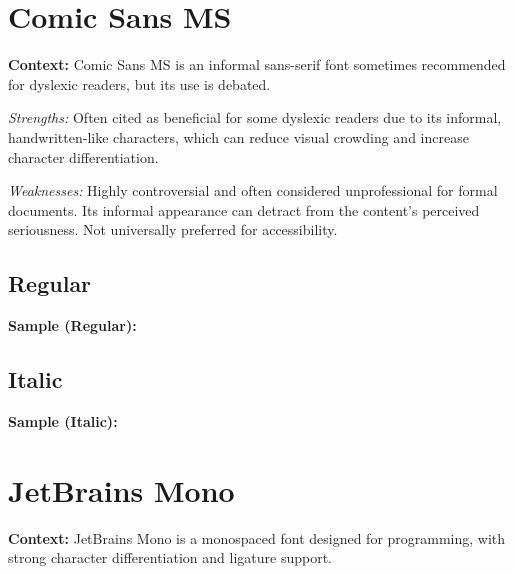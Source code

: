 \pagebreak
\section{Comic Sans MS}\label{trouble9}
\noindent
\textbf{Context:} Comic Sans MS is an informal sans-serif font sometimes recommended for dyslexic readers, but its use is debated.

\begin{raggedright}
\emph{Strengths:} Often cited as beneficial for some dyslexic readers due to its informal, handwritten-like characters, which can reduce visual crowding and increase character differentiation.

\emph{Weaknesses:} Highly controversial and often considered unprofessional for formal documents. Its informal appearance can detract from the content's perceived seriousness. Not universally preferred for accessibility.

\subsection{Regular}
\noindent\textbf{Sample (Regular):}
\FontSample{\comicsansfont}

\subsection{Italic}
\noindent\textbf{Sample (Italic):}
\FontSample{{\comicsansfont\itshape}}
\end{raggedright}


\pagebreak
\hypertarget{trouble10}{}\section[JetBrains Mono]{JetBrains Mono \cite{JetBrainsMono}}\label{trouble10}
\noindent
\textbf{Context:} JetBrains Mono is a monospaced font designed for programming, with strong character differentiation and ligature support.

